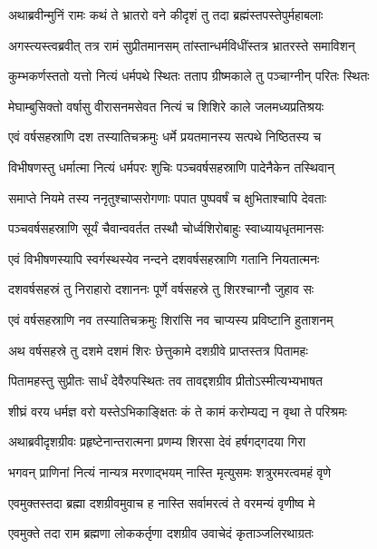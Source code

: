 
\twolineshloka
{अथाब्रवीन्मुनिं रामः कथं ते भ्रातरो वने}
{कीदृशं तु तदा ब्रह्मंस्तपस्तेपुर्महाबलाः} %

\twolineshloka
{अगस्त्यस्त्वब्रवीत् तत्र रामं सुप्रीतमानसम्}
{तांस्तान्धर्मविधींस्तत्र भ्रातरस्ते समाविशन्} %

\twolineshloka
{कुम्भकर्णस्ततो यत्तो नित्यं धर्मपथे स्थितः}
{तताप ग्रीष्मकाले तु पञ्चाग्नीन् परितः स्थितः} %

\twolineshloka
{मेघाम्बुसिक्तो वर्षासु वीरासनमसेवत}
{नित्यं च शिशिरे काले जलमध्यप्रतिश्रयः} %

\twolineshloka
{एवं वर्षसहस्राणि दश तस्यातिचक्रमुः}
{धर्मे प्रयतमानस्य सत्पथे निष्ठितस्य च} %

\twolineshloka
{विभीषणस्तु धर्मात्मा नित्यं धर्मपरः शुचिः}
{पञ्चवर्षसहस्राणि पादेनैकेन तस्थिवान्} %

\twolineshloka
{समाप्ते नियमे तस्य ननृतुश्चाप्सरोगणाः}
{पपात पुष्पवर्षं च क्षुभिताश्चापि देवताः} %

\twolineshloka
{पञ्चवर्षसहस्राणि सूर्यं चैवान्ववर्तत}
{तस्थौ चोर्ध्वशिरोबाहुः स्वाध्यायधृतमानसः} %

\twolineshloka
{एवं विभीषणस्यापि स्वर्गस्थस्येव नन्दने}
{दशवर्षसहस्राणि गतानि नियतात्मनः} %

\twolineshloka
{दशवर्षसहस्रं तु निराहारो दशाननः}
{पूर्णे वर्षसहस्रे तु शिरश्चाग्नौ जुहाव सः} %

\twolineshloka
{एवं वर्षसहस्राणि नव तस्यातिचक्रमुः}
{शिरांसि नव चाप्यस्य प्रविष्टानि हुताशनम्} %

\twolineshloka
{अथ वर्षसहस्रे तु दशमे दशमं शिरः}
{छेत्तुकामे दशग्रीवे प्राप्तस्तत्र पितामहः} %

\twolineshloka
{पितामहस्तु सुप्रीतः सार्धं देवैरुपस्थितः}
{तव तावद्दशग्रीव प्रीतोऽस्मीत्यभ्यभाषत} %

\twolineshloka
{शीघ्रं वरय धर्मज्ञ वरो यस्तेऽभिकाङ्क्षितः}
{कं ते कामं करोम्यद्य न वृथा ते परिश्रमः} %

\twolineshloka
{अथाब्रवीदृशग्रीवः प्रहृष्टेनान्तरात्मना}
{प्रणम्य शिरसा देवं हर्षगद्गदया गिरा} %

\twolineshloka
{भगवन् प्राणिनां नित्यं नान्यत्र मरणाद्भयम्}
{नास्ति मृत्युसमः शत्रुरमरत्वमहं वृणे} %

\twolineshloka
{एवमुक्तस्तदा ब्रह्मा दशग्रीवमुवाच ह}
{नास्ति सर्वामरत्वं ते वरमन्यं वृणीष्व मे} %

\twolineshloka
{एवमुक्ते तदा राम ब्रह्मणा लोककर्तृणा}
{दशग्रीव उवाचेदं कृताञ्जलिरथाग्रतः} %

